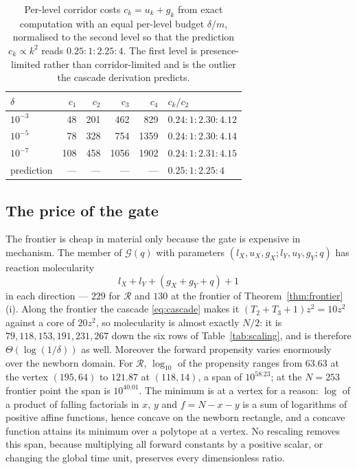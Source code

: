\documentclass[11pt]{article}
\theoremstyle{plain}
\theoremstyle{definition}
\theoremstyle{remark}
\begin{document}
\begin{table}[t]
\centering\small
\caption{Per-level corridor costs $c_k=u_k+g_k$ from exact computation with an
equal per-level budget $\delta/m$, normalised to the second level so that the
prediction $c_k\propto k^{2}$ reads $0.25:1:2.25:4$. The first level is
presence-limited rather than corridor-limited and is the outlier the cascade
derivation predicts.}
\label{tab:cascade}
\begin{tabular}{lrrrrl}
\toprule
$\delta$ & $c_1$ & $c_2$ & $c_3$ & $c_4$ & $c_k/c_2$\\
\midrule
$10^{-3}$ & 48 & 201 & 462 & 829 & $0.24:1:2.30:4.12$\\
$10^{-5}$ & 78 & 328 & 754 & 1359 & $0.24:1:2.30:4.14$\\
$10^{-7}$ & 108 & 458 & 1056 & 1902 & $0.24:1:2.31:4.15$\\
\midrule
prediction & --- & --- & --- & --- & $0.25:1:2.25:4$\\
\bottomrule
\end{tabular}
\end{table}

\subsection{The price of the gate}

The frontier is cheap in material only because the gate is expensive in
mechanism. The member of $\mathcal{G}(q)$ with parameters
$(l_X,u_X,g_X;l_Y,u_Y,g_Y;q)$ has reaction molecularity
\begin{equation}\label{eq:molecularity}
l_X+l_Y+(g_X+g_Y+q)+1
\end{equation}
in each direction --- $229$ for $\mathcal{R}$ and $130$ at the frontier of
Theorem~\ref{thm:frontier}(i). Along the frontier the cascade
\eqref{eq:cascade} makes it $(T_2+T_3+1)z^{2}=10z^{2}$ against a core of
$20z^{2}$, so molecularity is almost exactly $N/2$: it is
$79,118,153,191,231,267$ down the six rows of Table~\ref{tab:scaling}, and is
therefore $\Theta(\log(1/\delta))$ as well. Moreover the forward
propensity varies enormously over the newborn domain. For $\mathcal{R}$, $\log_{10}$ of the propensity ranges from $63.63$ at the vertex
$(195,64)$ to $121.87$ at $(118,14)$, a span of $10^{58.23}$; at the
$N=253$ frontier point the span is $10^{40.01}$. The minimum is at a vertex
for a reason: $\log$ of a product of falling factorials in $x$, $y$ and
$f=N-x-y$ is a sum of logarithms of positive affine functions, hence concave
on the newborn rectangle, and a concave function attains its minimum over a
polytope at a vertex. No rescaling removes this span, because multiplying all
forward constants by a positive scalar, or changing the global time unit,
preserves every dimensionless ratio.
\end{document}
